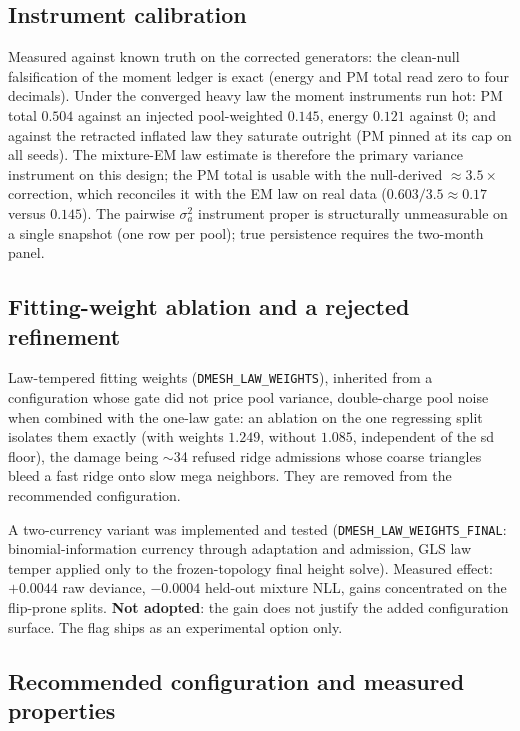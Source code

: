 \documentclass[11pt]{article}
\begin{document}
\subsection{Instrument calibration}

Measured against known truth on the corrected generators: the clean-null
falsification of the moment ledger is exact (energy and PM total read zero
to four decimals). Under the converged heavy law the moment instruments run
hot: PM total $0.504$ against an injected pool-weighted $0.145$, energy
$0.121$ against $0$; and against the retracted inflated law they saturate
outright (PM pinned at its cap on all seeds). The mixture-EM law estimate is
therefore the primary variance instrument on this design; the PM total is
usable with the null-derived $\approx 3.5\times$ correction, which
reconciles it with the EM law on real data ($0.603/3.5\approx 0.17$ versus
$0.145$). The pairwise $\sigma_a^2$ instrument proper is structurally
unmeasurable on a single snapshot (one row per pool); true persistence
requires the two-month panel.

\subsection{Fitting-weight ablation and a rejected refinement}

Law-tempered fitting weights (\texttt{DMESH\_LAW\_WEIGHTS}), inherited from
a configuration whose gate did not price pool variance, double-charge pool
noise when combined with the one-law gate: an ablation on the one regressing
split isolates them exactly (with weights $1.249$, without $1.085$,
independent of the sd floor), the damage being $\sim$34 refused ridge
admissions whose coarse triangles bleed a fast ridge onto slow mega
neighbors. They are removed from the recommended configuration.

A two-currency variant was implemented and tested
(\texttt{DMESH\_LAW\_WEIGHTS\_FINAL}: binomial-information currency through
adaptation and admission, GLS law temper applied only to the
frozen-topology final height solve). Measured effect: $+0.0044$ raw
deviance, $-0.0004$ held-out mixture NLL, gains concentrated on the
flip-prone splits. \textbf{Not adopted}: the gain does not justify the added
configuration surface. The flag ships as an experimental option only.

\subsection{Recommended configuration and measured properties}
\end{document}

